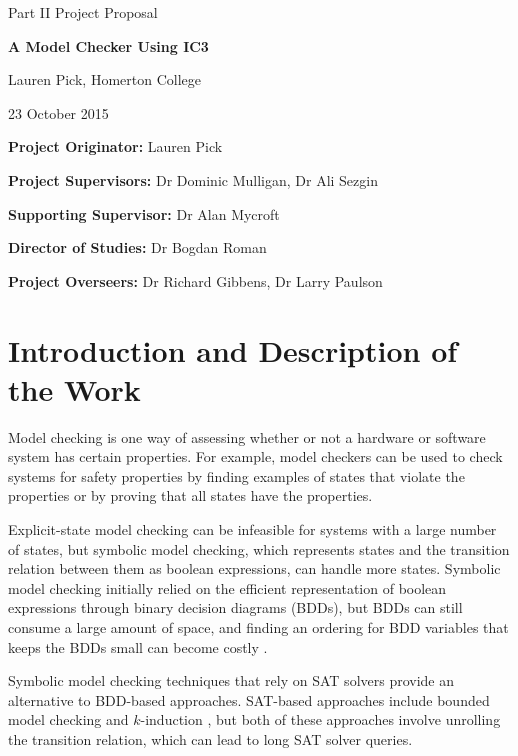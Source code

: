 \documentclass[12pt,a4paper,twoside]{article}
\begin{document}
\vfil

\centerline{\Large Part II Project Proposal}
\vspace{0.4in}
\centerline{\Large \bf A Model Checker Using IC3}
\vspace{0.4in}
\centerline{\large Lauren Pick, Homerton College}
\vspace{0.4in}
\centerline{\large 23 October 2015}
\vspace{0.4in}

\noindent
{\bf Project Originator:} Lauren Pick
\vspace{0.2in}

\noindent
{\bf Project Supervisors:} Dr Dominic Mulligan, Dr Ali Sezgin
\vspace{0.2in}

\noindent
{\bf Supporting Supervisor:} Dr Alan Mycroft
\vspace{0.2in}

\noindent
{\bf Director of Studies:} Dr Bogdan Roman
\vspace{0.2in}
 
\noindent
{\bf Project Overseers:} Dr Richard Gibbens, Dr Larry Paulson


\section*{Introduction and Description of the Work}
Model checking is one way of assessing whether or not a hardware or
software system has certain properties. For example, model checkers can be
used to check systems for safety properties by finding examples of states
that violate the properties or by proving that all states have the
properties.

Explicit-state model checking can be infeasible for systems with a large
number of states, but symbolic model checking, which represents
states and the transition relation between them as boolean expressions,
can handle more states. Symbolic model checking initially relied on the
efficient representation of boolean expressions through binary decision
diagrams (BDDs), but BDDs can still consume a large amount of space, and
finding an ordering for BDD variables that keeps the BDDs small can become
costly \cite{biere99}.

Symbolic model checking techniques that rely on SAT solvers provide an
alternative to BDD-based approaches. SAT-based approaches include
bounded model checking \cite{biere99} and $k$-induction \cite{demoura03},
but both of these approaches involve unrolling the transition relation,
which can lead to long SAT solver queries.
\end{document}
